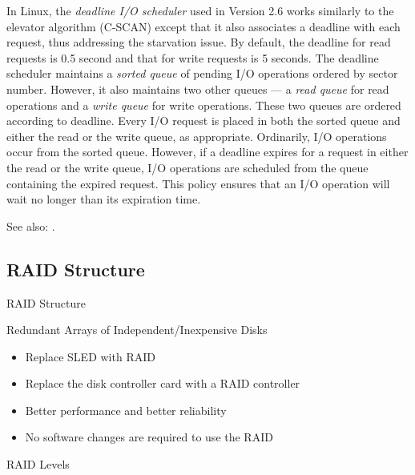 In Linux, the \emph{deadline I/O scheduler} used in Version 2.6 works similarly to the
elevator algorithm (C-SCAN) except that it also associates a deadline with each request,
thus addressing the starvation issue. By default, the deadline for read requests is 0.5
second and that for write requests is 5 seconds. The deadline scheduler maintains a
\emph{sorted queue} of pending I/O operations ordered by sector number. However, it also
maintains two other queues --- a \emph{read queue} for read operations and a
\emph{write queue} for write operations. These two queues are ordered according to
deadline. Every I/O request is placed in both the sorted queue and either the read or the
write queue, as appropriate. Ordinarily, I/O operations occur from the sorted
queue. However, if a deadline expires for a request in either the read or the write queue,
I/O operations are scheduled from the queue containing the expired request. This policy
ensures that an I/O operation will wait no longer than its expiration
time.

See also: .

\subsection{RAID Structure}

\begin{frame}{RAID Structure}
  \begin{block}{Redundant Arrays of Independent/Inexpensive Disks}
    \begin{itemize}
    \item[\PackingWaste] Replace SLED with RAID
    \item[\PackingWaste] Replace the disk controller card with a RAID controller
    \item[\good] Better performance and better reliability
    \item[\good] No software changes are required to use the RAID
    \end{itemize}
  \end{block}
\end{frame}

\begin{frame}{RAID Levels}
  \begin{center}
     
  \end{center}
\end{frame}


